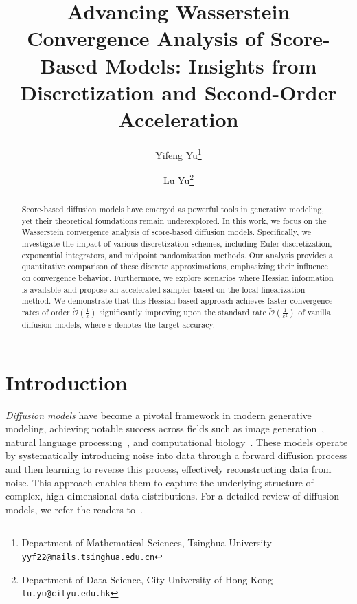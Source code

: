 \documentclass[11pt]{article}
\begin{document}
\title{Advancing Wasserstein Convergence Analysis of Score-Based Models: Insights from Discretization and Second-Order Acceleration}

 \author{
 Yifeng Yu\thanks{Department of Mathematical Sciences, Tsinghua University \texttt{yyf22@mails.tsinghua.edu.cn}}
 \and 
 Lu Yu\thanks{
  Department of Data Science,
  City University of Hong Kong \texttt{lu.yu@cityu.edu.hk}
 }
}

\maketitle

\begin{abstract}
Score-based diffusion models have emerged as powerful tools in generative modeling, yet their theoretical foundations remain underexplored. 
In this work, we focus on the Wasserstein convergence analysis of score-based diffusion models. Specifically, we investigate the impact of various discretization schemes, including Euler discretization, exponential integrators, and midpoint randomization methods. 
Our analysis provides a quantitative comparison of these discrete approximations, emphasizing their influence on convergence behavior. 
Furthermore, we explore scenarios where Hessian information is available and propose an accelerated sampler based on the local linearization method. 
We demonstrate that this Hessian-based approach achieves faster convergence rates of order 
$\widetilde{\mathcal{O}}\left(\frac{1}{\varepsilon}\right)$ significantly improving upon the standard 
rate $\widetilde{\mathcal{O}}\left(\frac{1}{\varepsilon^2}\right)$ of vanilla diffusion models, where $\varepsilon$ denotes the target accuracy.

\end{abstract}


\section{Introduction}

\textit{Diffusion models} have become a pivotal framework in modern generative modeling, achieving notable success across fields such as image generation~\cite{ramesh2022hierarchical,ho2020denoising,song2020denoising,dhariwal2021diffusion}, natural language processing~\cite{popov2021grad}, and computational biology~\cite{xu2022geodiff,anand2022protein}. These models operate by systematically introducing noise into data through a forward diffusion process and then learning to reverse this process, effectively reconstructing data from noise. This approach enables them to capture the underlying structure of complex, high-dimensional data distributions. %
For a detailed review of diffusion models, we refer the readers to~\cite{yang2023diffusion,tang2024score,chen2024overview}.
\end{document}
